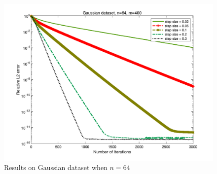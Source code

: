 \documentclass{article}
\begin{document}
\begin{figure}
\begin{minipage}{0.33\linewidth}
			\includegraphics[width=1\linewidth]{./fig/gaussian+13.png}
			\caption{$m=1200$}
		\end{minipage}
		\caption*{Results on Gaussian dataset when $n=64$}
	\end{figure}
\end{document}
